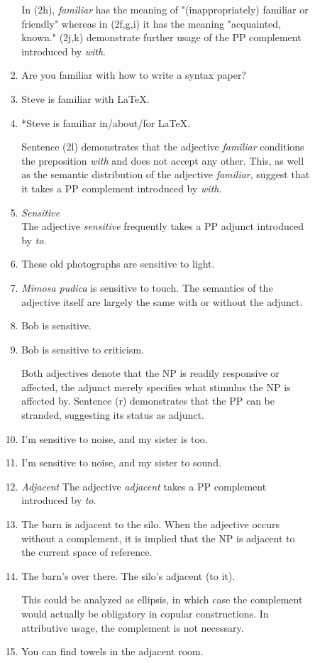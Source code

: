 \documentclass[12pt]{article}
\begin{document}
\begin{enumerate}
\begin{enumerate}
\begin{itemize}[leftmargin=*]
\begin{enumerate}
In (2h), \emph{familiar} has the meaning of "(inappropriately) familiar or friendly" whereas in (2f,g,i) it has the meaning "acquainted, known." (2j,k) demonstrate further usage of the PP complement introduced by \emph{with}.
\item Are you familiar with how to write a syntax paper?
\item Steve is familiar with \LaTeX .
\item *Steve is familiar in/about/for \LaTeX .

Sentence (2l) demonstrates that the adjective \emph{familiar} conditions the preposition \emph{with} and does not accept any other. This, as well as the semantic distribution of the adjective \emph{familiar}, suggest that it takes a PP complement introduced by \emph{with}.
\item[] \emph{Sensitive}\\
The adjective \emph{sensitive} frequently takes a PP adjunct introduced by \emph{to}.
\item These old photographs are sensitive to light.
\item \emph{Mimosa pudica} is sensitive to touch.
The semantics of the adjective itself are largely the same with or without the adjunct.
\item Bob is sensitive.
\item Bob is sensitive to criticism.

Both adjectives denote that the NP is readily responsive or affected, the adjunct merely specifies what stimulus the NP is affected by. Sentence (r) demonstrates that the PP can be stranded, suggesting its status as adjunct.
\item I'm sensitive to noise, and my sister is too.
\item I'm sensitive to noise, and my sister to sound.
\item[] \emph{Adjacent}
The adjective \emph{adjacent} takes a PP complement introduced by \emph{to}.
\item The barn is adjacent to the silo.
When the adjective occurs without a complement, it is implied that the NP is adjacent to the current space of reference.
\item The barn's over there. The silo's adjacent (to it).

This could be analyzed as ellipsis, in which case the complement would actually be obligatory in copular constructions. In attributive usage, the complement is not necessary.
\item You can find towels in the adjacent room.


\end{enumerate}
\end{itemize}
\end{enumerate}
\end{enumerate}
\end{document}
